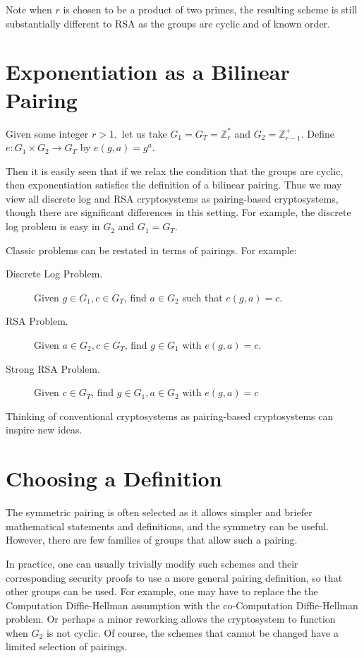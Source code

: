 Note when $r$ is chosen to be a product of two primes, the resulting scheme
is still substantially different to RSA as the groups are cyclic and of
known order.

\section{Exponentiation as a Bilinear Pairing}

Given some integer $r > 1,$
let us take $G_1 = G_T = \mathbb{Z}_r^*$ and $G_2 = \mathbb{Z}_{r-1}^+$.
Define $e:G_1\times G_2 \rightarrow G_T$ by $e(g, a)= g^a$.

Then it is easily seen that if we relax the condition that the groups
are cyclic, then exponentiation satisfies the definition of a bilinear pairing.
Thus we may view all discrete log and RSA cryptosystems
as pairing-based cryptosystems, though there are significant differences
in this setting. For example, the discrete log problem is easy
in $G_2$ and $G_1 = G_T$.

Classic problems can be restated in terms of
pairings. For example:

\begin{description}
\item[Discrete Log Problem.]
Given $g \in G_1, c \in G_T$, find $a \in G_2$ such that $e(g,a) = c$.
\item[RSA Problem.]
Given $a \in G_2, c \in G_T$, find $g \in G_1$ with
$e(g,a) = c$.
\item[Strong RSA Problem.]
Given $c \in G_T$, find $g \in G_1, a\in G_2$ with
$e(g,a) = c$
\end{description}

Thinking of conventional cryptosystems as pairing-based cryptosystems
can inspire new ideas.

\section{Choosing a Definition}

The symmetric pairing is often selected
as it allows simpler and briefer mathematical statements and definitions,
and the symmetry can be useful.
However, there are few families of groups that allow such a pairing.

In practice, one can usually trivially modify such
schemes and their corresponding
security proofs to use a more general pairing definition,
so that other groups can be used. For example, one may have to replace the
the Computation Diffie-Hellman assumption with
the co-Computation Diffie-Hellman problem. Or perhaps
a minor reworking allows the cryptosystem to function when $G_2$
is not cyclic.
Of course, the schemes that cannot be changed have a limited selection
of pairings.

